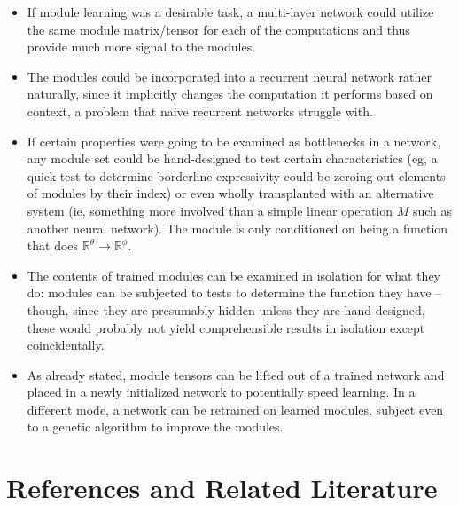\documentclass[12pt]{article}
\begin{document}
\begin{itemize}
\item If module learning was a desirable task, a multi-layer network could utilize the same module matrix/tensor for each of the computations and thus provide much more signal to the modules.  
\item The modules could be incorporated into a recurrent neural network rather naturally, since it implicitly changes the computation it performs based on context, a problem that naive recurrent networks struggle with.  \item If certain properties were going to be examined as bottlenecks in a network, any module set could be hand-designed to test certain characteristics (eg, a quick test to determine borderline expressivity could be zeroing out elements of modules by their index) or even wholly transplanted with an alternative system (ie, something more involved than a simple linear operation $M$ such as another neural network).  The module is only conditioned on being a function that does $\mathbb{R}^{\theta} \rightarrow \mathbb{R}^{\phi}$.
\item The contents of trained modules can be examined in isolation for what they do: modules can be subjected to tests to determine the function they have -- though, since they are presumably hidden unless they are hand-designed, these would probably not yield comprehensible results in isolation except coincidentally.
\item As already stated, module tensors can be lifted out of a trained network and placed in a newly initialized network to potentially speed learning.  In a different mode, a network can be retrained on learned modules, subject even to a genetic algorithm to improve the modules.
\end{itemize}


\section{References and Related Literature}\label{Related Literature // Bibliography}
\end{document}
